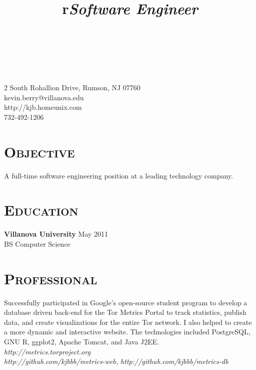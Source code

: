 \documentclass[line,margin]{resume}
\begin{document}
\begin{format}
  \title{r}\\
  \\
  \body\\
\end{format}


\begin{resume}
\begin{flushright}
2 South Rohallion Drive, Rumson, NJ 07760 \\
kevin.berry@villanova.edu \\
http://kjb.homeunix.com \\
732-492-1206 \\
\end{flushright}

\section{\textsc{Objective}}
A full-time software engineering position at a leading technology company.
\section{\textsc{Education}}

\textbf{Villanova University} \hfill May 2011 \\
BS Computer Science


\section{\textsc{Professional}}

\title{\emph{Software Engineer}}
\begin{position}
Successfully participated in Google's open-source student program to develop a
database driven back-end for the Tor Metrics Portal to track statistics, publish
data, and create visualizations for the entire Tor network. I also helped to
create a more dynamic and interactive website. The technologies included
PostgreSQL, GNU R, ggplot2, Apache Tomcat, and Java J2EE.\\
\emph{http://metrics.torproject.org} \\
\emph{http://github.com/kjbbb/metrics-web, http://github.com/kjbbb/metrics-db}
\end{position}


\end{resume}
\end{document}
